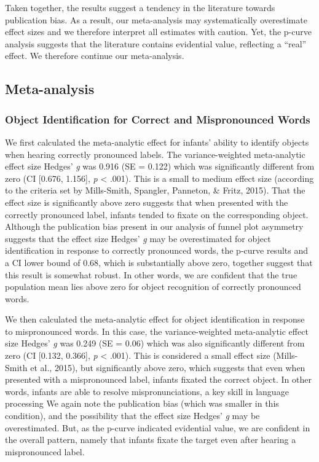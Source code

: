 \documentclass[man]{apa6}
\theoremstyle{definition}
\theoremstyle{definition}
\theoremstyle{definition}
\theoremstyle{remark}
\begin{document}
Taken together, the results suggest a tendency in the literature towards
publication bias. As a result, our meta-analysis may systematically
overestimate effect sizes and we therefore interpret all estimates with
caution. Yet, the p-curve analysis suggests that the literature contains
evidential value, reflecting a \enquote{real} effect. We therefore
continue our meta-analysis.

\subsection{Meta-analysis}\label{meta-analysis-1}

\subsubsection{Object Identification for Correct and Mispronounced
Words}\label{object-identification-for-correct-and-mispronounced-words}

We first calculated the meta-analytic effect for infants' ability to
identify objects when hearing correctly pronounced labels. The
variance-weighted meta-analytic effect size Hedges' \emph{g} was 0.916
(SE = 0.122) which was significantly different from zero (CI {[}0.676,
1.156{]}, \emph{p} \textless{} .001). This is a small to medium effect
size (according to the criteria set by Mills-Smith, Spangler, Panneton,
\& Fritz, 2015). That the effect size is significantly above zero
suggests that when presented with the correctly pronounced label,
infants tended to fixate on the corresponding object. Although the
publication bias present in our analysis of funnel plot asymmetry
suggests that the effect size Hedges' \emph{g} may be overestimated for
object identification in response to correctly pronounced words, the
p-curve results and a CI lower bound of 0.68, which is substantially
above zero, together suggest that this result is somewhat robust. In
other words, we are confident that the true population mean lies above
zero for object recognition of correctly pronounced words.

We then calculated the meta-analytic effect for object identification in
response to mispronounced words. In this case, the variance-weighted
meta-analytic effect size Hedges' \emph{g} was 0.249 (SE = 0.06) which
was also significantly different from zero (CI {[}0.132, 0.366{]},
\emph{p} \textless{} .001). This is considered a small effect size
(Mills-Smith et al., 2015), but significantly above zero, which suggests
that even when presented with a mispronounced label, infants fixated the
correct object. In other words, infants are able to resolve
mispronunciations, a key skill in language processing We again note the
publication bias (which was smaller in this condition), and the
possibility that the effect size Hedges' \emph{g} may be overestimated.
But, as the p-curve indicated evidential value, we are confident in the
overall pattern, namely that infants fixate the target even after
hearing a mispronounced label.
\end{document}
